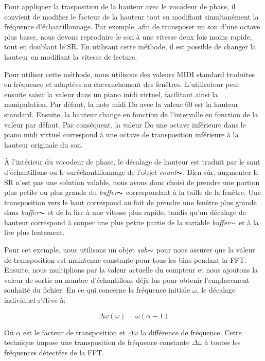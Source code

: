     Pour appliquer la trasposition de la hauteur avec le vocodeur de phase, il convient de modifier le facteur de la hauteur tout en modifiant simultanément la fréquence d'échantillonnage. Par exemple, afin de transposer un son d'une octave plus basse, nous devons reproduire le son à une vitesse deux fois moins rapide, tout en doublant le SR. En utilisant cette méthode, il est possible de changer la hauteur en modifiant la vitesse de lecture.

    Pour utiliser cette méthode, nous utilisons des valeurs MIDI standard traduites en fréquence et adaptées au chevauchement des fenêtres. L'utilisateur peut ensuite saisir la valeur dans un piano midi virtuel, facilitant ainsi la manipulation. Par défaut, la note midi Do avec la valeur 60 est la hauteur standard. Ensuite, la hauteur change en fonction de l'intervalle en fonction de la valeur par défaut. Par conséquent, la valeur Do une octave inférieure dans le piano midi virtuel correspond à une octave de transposition inférieure à la hauteur originale du son.

    À l'intérieur du vocodeur de phase, le décalage de hauteur est traduit par le saut d'échantillons ou le suréchantillonnage de l'objet  \textit{count}$\thicksim $. Bien sûr, augmenter le SR n'est pas une solution valable, nous avons donc choisi de prendre une portion plus petite ou plus grande du \textit{buffer}$\thicksim $ correspondant à la taille de la fenêtre. Une transposition vers le haut correspond au fait de prendre une fenêtre plus grande dans \textit{buffer}$\thicksim $ et de la lire à une vitesse plus rapide, tandis qu'un décalage de hauteur correspond à couper une plus petite partie de la variable \textit{buffer}$\thicksim $ et à la lire plus lentement.

    Pour cet exemple, nous utilisons un objet \textit{sah}$\thicksim $ pour nous assurer que la valeur de transposition est maintenue constante pour tous les bins pendant la FFT. Ensuite, nous multiplions par la valeur actuelle du compteur et nous ajoutons la valeur de sortie au nombre d'échantillons déjà lus pour obtenir l'emplacement souhaité du fichier. En ce qui concerne la fréquence initiale $ \omega $, le décalage individuel s’élève à:

    \begin{equation*}
        \Delta \omega(\omega) = \omega (\alpha - 1)
    \end{equation*}

    Où $ \alpha $ est le facteur de transposition et $ \Delta \omega $ la différence de fréquence. Cette technique impose une transposition de fréquence constante $ \Delta \omega $ à toutes les fréquences détectées de la FFT.

